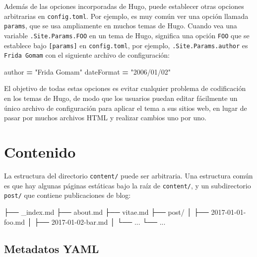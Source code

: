 \documentclass[12pt,]{krantz}
\makeatletter
\newenvironment{Shaded}{\begin{snugshade}}{\end{snugshade}}
\newcommand{\ExtensionTok}[1]{#1}
\newcommand{\NormalTok}[1]{#1}
\newcommand{\OperatorTok}[1]{\textcolor[rgb]{0.81,0.36,0.00}{\textbf{#1}}}
\newcommand{\StringTok}[1]{\textcolor[rgb]{0.31,0.60,0.02}{#1}}
\newenvironment{kframe}{%
\medskip{}
\setlength{\fboxsep}{.8em}
 \def\at@end@of@kframe{}%
 \ifinner\ifhmode%
  \def\at@end@of@kframe{\end{minipage}}%
  \begin{minipage}{\columnwidth}%
 \fi\fi%
 \def\FrameCommand##1{\hskip\@totalleftmargin \hskip-\fboxsep
 \colorbox{shadecolor}{##1}\hskip-\fboxsep
     \hskip-\linewidth \hskip-\@totalleftmargin \hskip\columnwidth}%
 \MakeFramed {\advance\hsize-\width
   \@totalleftmargin\z@ \linewidth\hsize
   \@setminipage}}%
 {\par\unskip\endMakeFramed%
 \at@end@of@kframe}
\renewenvironment{Shaded}{\begin{kframe}}{\end{kframe}}
\theoremstyle{definition}
\theoremstyle{definition}
\theoremstyle{definition}
\theoremstyle{remark}
\makeatother
\begin{document}
Además de las opciones incorporadas de Hugo, puede establecer otras
opciones arbitrarias en \texttt{config.toml}. Por ejemplo, es muy común
ver una opción llamada \texttt{params}, que se usa ampliamente en muchos
temas de Hugo. Cuando vea una variable \texttt{.Site.Params.FOO} en un
tema de Hugo, significa una opción \texttt{FOO} que se establece bajo
\texttt{{[}params{]}} en \texttt{config.toml}, por ejemplo,
\texttt{.Site.Params.author} es \texttt{Frida\ Gomam} con el siguiente
archivo de configuración:

\begin{Shaded}
\begin{Highlighting}[]
\NormalTok{[params]}
\NormalTok{    author }\OperatorTok{=} \StringTok{"Frida Gomam"}
\NormalTok{    dateFormat }\OperatorTok{=} \StringTok{"2006/01/02"}
\end{Highlighting}
\end{Shaded}

El objetivo de todas estas opciones es evitar cualquier problema de
codificación en los temas de Hugo, de modo que los usuarios puedan
editar fácilmente un único archivo de configuración para aplicar el tema
a sus sitios web, en lugar de pasar por muchos archivos HTML y realizar
cambios uno por uno.

\hypertarget{contenido}{%
\section{Contenido}\label{contenido}}

La estructura del directorio \texttt{content/} puede ser arbitraria. Una
estructura común es que hay algunas páginas estáticas bajo la raíz de
\texttt{content/}, y un subdirectorio \texttt{post/} que contiene
publicaciones de blog:

\begin{Shaded}
\begin{Highlighting}[]
\NormalTok{├── }\ExtensionTok{_index.md}
\NormalTok{├── }\ExtensionTok{about.md}
\NormalTok{├── }\ExtensionTok{vitae.md}
\NormalTok{├── }\ExtensionTok{post/}
\NormalTok{│   ├── }\ExtensionTok{2017-01-01-foo.md}
\NormalTok{│   ├── }\ExtensionTok{2017-01-02-bar.md}
\NormalTok{│   └── }\ExtensionTok{...}
\NormalTok{└── }\ExtensionTok{...}
\end{Highlighting}
\end{Shaded}

\hypertarget{metadatos-yaml}{%
\subsection{Metadatos YAML}\label{metadatos-yaml}}
\end{document}

